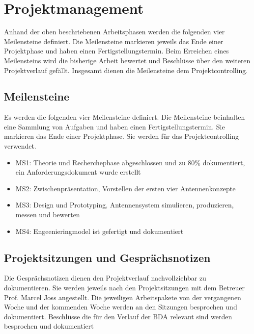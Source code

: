 \newpage
\section{Projektmanagement}
Anhand der oben beschriebenen Arbeitsphasen werden die folgenden vier Meilensteine definiert. Die Meilensteine markieren jeweils das Ende einer Projektphase und haben einen Fertigstellungstermin. Beim Erreichen eines Meilensteins wird die bisherige Arbeit bewertet und Beschlüsse über den weiteren Projektverlauf gefällt. Insgesamt dienen die Meilensteine dem Projektcontrolling.
\subsection{Meilensteine}
Es werden die folgenden vier Meilensteine definiert. Die Meilensteine
beinhalten   eine Sammlung von Aufgaben und haben einen
Fertigstellungstermin. Sie markieren das Ende einer Projektphase. Sie
werden für das Projektcontrolling verwendet. 
	\begin{itemize}
		\item MS1: Theorie und Recherchephase abgeschlossen und zu 80\% dokumentiert, ein Anforderungsdokument wurde erstellt
		\item MS2: Zwischenpräsentation, Vorstellen der ersten vier Antennenkonzepte
		\item MS3: Design und Prototyping, Antennensystem simulieren, produzieren, messen und bewerten
		\item MS4: Engeenieringmodel ist gefertigt und dokumentiert
	\end{itemize}

\subsection{ Projektsitzungen und Gesprächsnotizen}
Die Gesprächsnotizen dienen den Projektverlauf nachvollziehbar zu dokumentieren. Sie werden jeweils nach den Projektsitzungen mit dem Betreuer Prof. Marcel Joss angestellt. Die jeweiligen Arbeitspakete von der vergangenen Woche und der kommenden Woche werden an den Sitzungen besprochen und dokumentiert. Beschlüsse die für den Verlauf der BDA relevant sind werden besprochen und dokumentiert